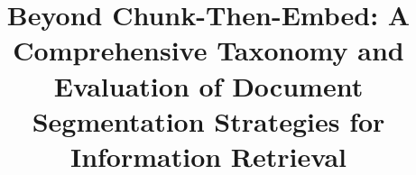 \documentclass[runningheads, anonymous=true]{llncs}
\theoremstyle{definition}
\begin{document}
%
\title{Beyond Chunk-Then-Embed: A Comprehensive Taxonomy and Evaluation of Document Segmentation Strategies for Information Retrieval}
%
%

%
%

%
\maketitle              %
%
\end{document}
